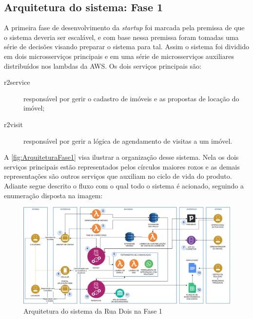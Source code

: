 \subsection{Arquitetura do sistema: Fase 1}
\label{sec:ArquiteturaFase1}

A primeira fase de desenvolvimento da \textit{startup} foi marcada pela premissa de
que o sistema deveria ser escalável, e com base nessa premissa foram tomadas uma
série de decisões visando preparar o sistema para tal. Assim o sistema foi dividido 
em dois microsserviços principais e em uma série de microsserviços auxiliares
distribuídos nos lambdas da \gls{AWS}. Os dois serviços principais são:

    \begin{description}
        \item [r2service] responsável por gerir o cadastro de imóveis e as propostas
        de locação do imóvel;
        \item [r2visit] responsável por gerir a lógica de agendamento de visitas
        a um imóvel.
    \end{description}

A \autoref{fig:ArquiteturaFase1} visa ilustrar a organização desse sistema. Nela
os dois serviços principais estão representados pelos círculos maiores roxos e as
demais representações são outros serviços que auxiliam no ciclo de vida do produto.
Adiante segue descrito o fluxo com o qual todo o sistema é acionado, seguindo a
enumeração disposta na imagem:

\begin{figure}[h]
  \centering
  \includegraphics[keepaspectratio=true,scale=0.3]{figuras/r2ArquiteturaFase1.eps}
  \caption{Arquitetura do sistema da Rua Dois na Fase 1\label{fig:ArquiteturaFase1}}
\end{figure}

